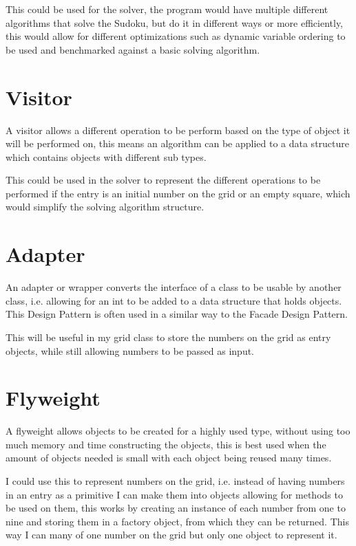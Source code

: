 \documentclass[]{final_report}
\begin{document}
This could be used for the solver, the program would have multiple different algorithms that solve the Sudoku, but do it in different ways or more efficiently, this would allow for different optimizations such as dynamic variable ordering to be used and benchmarked against a basic solving algorithm.

\section*{Visitor}

A visitor allows a different operation to be perform based on the type of object it will be performed on, this means an algorithm can be applied to a data structure which contains objects with different sub types.

This could be used in the solver to represent the different operations to be performed if the entry is an initial number on the grid or an empty square, which would simplify the solving algorithm structure.

\section*{Adapter}

An adapter or wrapper converts the interface of a class to be usable by another class, i.e. allowing for an int to be added to a data structure that holds objects. This Design Pattern is often used in a similar way to the Facade Design Pattern.

This will be useful in my grid class to store the numbers on the grid as entry objects, while still allowing numbers to be passed as input.

\section*{Flyweight}

A flyweight allows objects to be created for a highly used type, without using too much memory and time constructing the objects, this is best used when the amount of objects needed is small with each object being reused many times.

I could use this to represent numbers on the grid, i.e. instead of having numbers in an entry as a primitive I can make them into objects allowing for methods to be used on them, this works by creating an instance of each number from one to nine and storing them in a factory object, from which they can be returned. This way I can many of one number on the grid but only one object to represent it.
\end{document}
